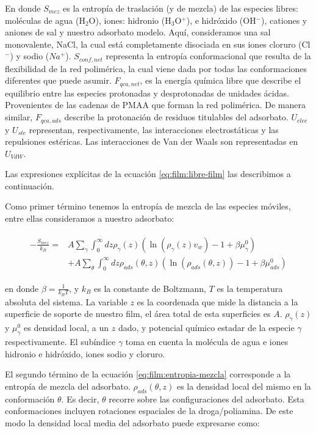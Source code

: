 \noindent En donde $S_{mez}$ es la entrop\'ia de traslaci\'on (y de mezcla) de las especies libres: mol\'eculas de agua (H$_2$O), iones:  hidronio (H$_3$O$^+$), e hidr\'oxido (OH$^- $), cationes y aniones de sal y nuestro adsorbato modelo. Aqu\'i, consideramos una sal monovalente, NaCl, la cual est\'a completamente disociada en sus  iones cloruro (Cl$^-$) y sodio ($Na^+$). 
$S_{conf,net}$ representa la entrop\'ia conformacional que resulta de la flexibilidad de la red polim\'erica, la cual viene dada por todas las conformaciones diferentes que puede asumir.
$F_{qca,net}$, es la energ\'ia qu\'imica libre que describe el equilibrio entre las especies protonadas y desprotonadas de unidades \'acidas. Provenientes de las cadenas de PMAA que forman la red polim\'erica.
De manera similar, $F_{qca,ads}$ describe la protonaci\'on de residuos titulables del adsorbato.
$U_{elec}$ y $U_{ste}$ representan, respectivamente, las interacciones electrost\'aticas y las repulsiones est\'ericas.
Las interacciones de Van der Waals son representadas en $U_{VdW}$.


Las expresiones expl\'icitas de la ecuaci\'on \ref{eq:film:libre-film} las describimos a continuaci\'on.

Como primer t\'ermino tenemos la entrop\'ia de mezcla de  las especies m\'oviles, entre ellas consideramos a nuestro adsorbato: 

\begin{align}
	\begin{aligned}
		-\frac{S_{mez}}{k_B}= &A\sum_{\gamma}\int_0^\infty{dz\rho_\gamma(z)\left(\ln \left(\rho_\gamma (z)v_w\right) -1 + \beta\mu^0_\gamma\right)} \\
		&+ A\sum_{\theta}\int_0^\infty{dz\rho_{ads}(\theta,z)\left(\ln \left(\rho_{ads}(\theta,z)\right) -1 + \beta\mu^0_{ads} \right)}
			\label{eq:film:entropia-mezcla}
	\end{aligned}
\end{align}

\noindent en donde $\beta = \frac{1}{k_B T}$, y $k_B$ es la constante de Boltzmann, $T$ es la temperatura absoluta del sistema. La variable $z$ es la coordenada que mide la distancia a la superficie de soporte de nuestro film, el \'area total de esta superficies es $A$. $\rho_\gamma(z)$ y $\mu^0_\gamma$ es densidad local, a un $z$ dado, y potencial qu\'imico estadar de la especie $\gamma$ respectivamente.
El sub\'indice $\gamma$ toma en cuenta la mol\'ecula de agua e iones hidronio e hidr\'oxido, iones sodio y cloruro.  


El segundo t\'ermino de la ecuaci\'on \ref{eq:film:entropia-mezcla} corresponde a la entrop\'ia de mezcla del adsorbato. $\rho_{ads}(\theta,z)$ es la densidad local del mismo en la conformaci\'on $\theta$. Es decir, $\theta$ recorre sobre las configuraciones del adsorbato.
Esta conformaciones incluyen rotaciones espaciales de la droga/poliamina.
De este modo la densidad local media del adsorbato  puede expresarse como:


